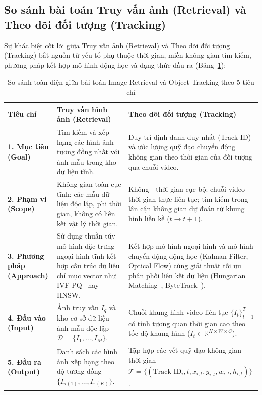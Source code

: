 \subsection{So sánh bài toán Truy vấn ảnh (Retrieval) và Theo dõi đối tượng (Tracking)}

Sự khác biệt cốt lõi giữa Truy vấn ảnh (Retrieval) và Theo dõi đối tượng (Tracking) bắt nguồn từ yếu tố phụ thuộc thời gian, miền không gian tìm kiếm, phương pháp kết hợp mô hình động học và dạng thức đầu ra (Bảng~\ref{tab:comp_retrieval_tracking}):

\begin{table}[H]
\centering
\small
\caption{So sánh toàn diện giữa bài toán Image Retrieval và Object Tracking theo 5 tiêu chí}
\label{tab:comp_retrieval_tracking}
\renewcommand{\arraystretch}{1.3}
\begin{tabularx}{\textwidth}{|p{2.8cm}|X|X|}
\hline
\textbf{Tiêu chí} & \textbf{Truy vấn hình ảnh (Retrieval)} & \textbf{Theo dõi đối tượng (Tracking)} \\
\hline
\textbf{1. Mục tiêu (Goal)} & Tìm kiếm và xếp hạng các hình ảnh tương đồng nhất với ảnh mẫu trong kho dữ liệu tĩnh. & Duy trì định danh duy nhất (Track ID) và ước lượng quỹ đạo chuyển động không gian theo thời gian của đối tượng qua chuỗi video. \\
\hline
\textbf{2. Phạm vi (Scope)} & Không gian toàn cục tĩnh: các mẫu dữ liệu độc lập, phi thời gian, không có liên kết vật lý thời gian. & Không - thời gian cục bộ: chuỗi video thời gian thực liên tục; tìm kiếm trong lân cận không gian dự đoán từ khung hình liền kề ($t \rightarrow t+1$). \\
\hline
\textbf{3. Phương pháp (Approach)} & Sử dụng thuần túy mô hình đặc trưng ngoại hình tĩnh kết hợp cấu trúc dữ liệu chỉ mục vector như IVF-PQ~\citep{jegou2011product} hay HNSW. & Kết hợp mô hình ngoại hình và mô hình chuyển động động học (Kalman Filter, Optical Flow) cùng giải thuật tối ưu phân phối liên kết dữ liệu (Hungarian Matching~\citep{kuhn1955hungarian}, ByteTrack~\citep{zhang2022bytetrack}). \\
\hline
\textbf{4. Đầu vào (Input)} & Ảnh truy vấn $I_q$ và kho cơ sở dữ liệu ảnh mẫu độc lập $\mathcal{D} = \{I_1, \dots, I_M\}$. & Chuỗi khung hình video liên tục $\{I_t\}_{t=1}^T$ có tính tương quan thời gian cao theo tốc độ khung hình ($I_t \in \mathbb{R}^{H \times W \times C}$). \\
\hline
\textbf{5. Đầu ra (Output)} & Danh sách các hình ảnh xếp hạng theo độ tương đồng $\{I_{\pi(1)}, \dots, I_{\pi(K)}\}$. & Tập hợp các vết quỹ đạo không gian - thời gian $\mathcal{T} = \{(\text{Track ID}_i, t, x_{i,t}, y_{i,t}, w_{i,t}, h_{i,t})\}$. \\
\hline
\end{tabularx}
\end{table}

